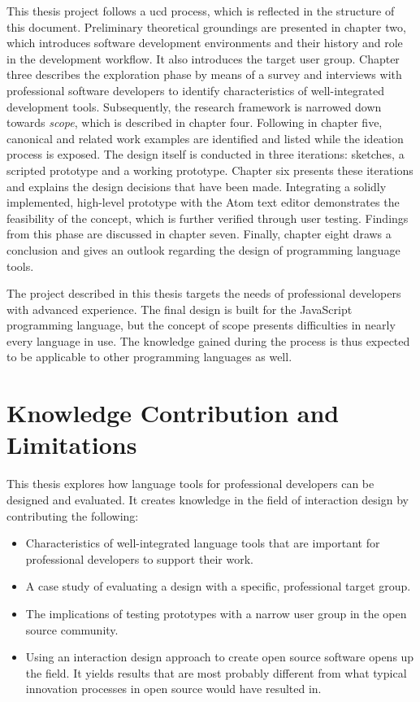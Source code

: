 This thesis project follows a \ac{ucd} process, which is reflected in
the structure of this document. Preliminary theoretical groundings are
presented in chapter two, which introduces software development
environments and their history and role in the development workflow. It
also introduces the target user group. Chapter three describes the
exploration phase by means of a survey and interviews with professional
software developers to identify characteristics of well-integrated
development tools. Subsequently, the research framework is narrowed down
towards \emph{scope}, which is described in chapter four. Following in
chapter five, canonical and related work examples are identified and
listed while the ideation process is exposed. The design itself is
conducted in three iterations: sketches, a scripted prototype and a
working prototype. Chapter six presents these iterations and explains
the design decisions that have been made. Integrating a solidly
implemented, high-level prototype with the Atom text editor demonstrates
the feasibility of the concept, which is further verified through user
testing. Findings from this phase are discussed in chapter seven.
Finally, chapter eight draws a conclusion and gives an outlook regarding
the design of programming language tools.

The project described in this thesis targets the needs of professional
developers with advanced experience. The final design is built for the
JavaScript programming language, but the concept of scope presents
difficulties in nearly every language in use. The knowledge gained
during the process is thus expected to be applicable to other
programming languages as well.

\section{Knowledge Contribution and
Limitations}\label{knowledge-contribution-and-limitations}

This thesis explores how language tools for professional developers can
be designed and evaluated. It creates knowledge in the field of
interaction design by contributing the following:

\begin{itemize}
\itemsep1pt\parskip0pt
\item
  Characteristics of well-integrated language tools that are important
  for professional developers to support their work.
\item
  A case study of evaluating a design with a specific, professional
  target group.
\item
  The implications of testing prototypes with a narrow user group in the
  open source community.
\item
  Using an interaction design approach to create open source software
  opens up the field. It yields results that are most probably different
  from what typical innovation processes in open source would have
  resulted in.
\end{itemize}

